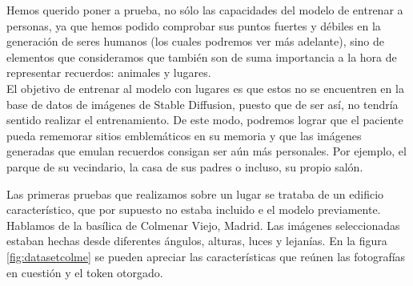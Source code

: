 

Hemos querido poner a prueba, no sólo las capacidades del modelo de entrenar a personas, ya que hemos podido comprobar sus puntos fuertes y débiles en la generación de seres humanos (los cuales podremos ver más adelante), sino de elementos que consideramos que también son de suma importancia a la hora de representar recuerdos: animales y lugares. \\

El objetivo de entrenar al modelo con lugares es que estos no se encuentren en la base de datos de imágenes de Stable Diffusion, puesto que de ser así, no tendría sentido realizar el entrenamiento. De este modo, podremos lograr que el paciente pueda rememorar sitios emblemáticos en su memoria y que las imágenes generadas que emulan recuerdos consigan ser aún más personales. Por ejemplo, el parque de su vecindario, la casa de sus padres o incluso, su propio salón. 

Las primeras pruebas que realizamos sobre un lugar se trataba de un edificio característico, que por supuesto no estaba incluido e el modelo previamente. Hablamos de la basílica de Colmenar Viejo, Madrid. Las imágenes seleccionadas estaban hechas desde diferentes ángulos, alturas, luces y lejanías. En la figura \ref{fig:datasetcolme} se pueden apreciar las características que reúnen las fotografías en cuestión y el token otorgado.

